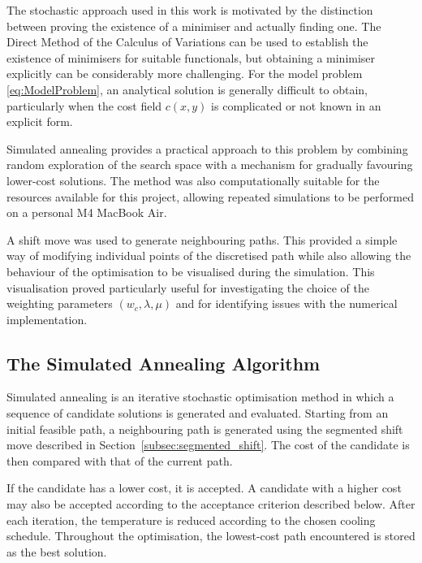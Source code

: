 The stochastic approach used in this work is motivated by the distinction between proving the existence of a minimiser and actually finding one. The Direct Method of the Calculus of Variations can be used to establish the existence of minimisers for suitable functionals, but obtaining a minimiser explicitly can be considerably more challenging. For the model problem \eqref{eq:ModelProblem}, an analytical solution is generally difficult to obtain, particularly when the cost field $c(x,y)$ is complicated or not known in an explicit form.

Simulated annealing provides a practical approach to this problem by combining random exploration of the search space with a mechanism for gradually favouring lower-cost solutions. The method was also computationally suitable for the resources available for this project, allowing repeated simulations to be performed on a personal M4 MacBook Air.

A shift move was used to generate neighbouring paths. This provided a simple way of modifying individual points of the discretised path while also allowing the behaviour of the optimisation to be visualised during the simulation. This visualisation proved particularly useful for investigating the choice of the weighting parameters $(w_c,\lambda,\mu)$ and for identifying issues with the numerical implementation.

\subsection{The Simulated Annealing Algorithm}
\label{subsec:simulated_annealing_algorithm}

Simulated annealing is an iterative stochastic optimisation method in
which a sequence of candidate solutions is generated and evaluated.
Starting from an initial feasible path, a neighbouring path is
generated using the segmented shift move described in
Section~\ref{subsec:segmented_shift}. The cost of the candidate is then
compared with that of the current path.

If the candidate has a lower cost, it is accepted. A candidate with a
higher cost may also be accepted according to the acceptance criterion
described below. After each iteration, the temperature is reduced
according to the chosen cooling schedule. Throughout the optimisation,
the lowest-cost path encountered is stored as the best solution.

